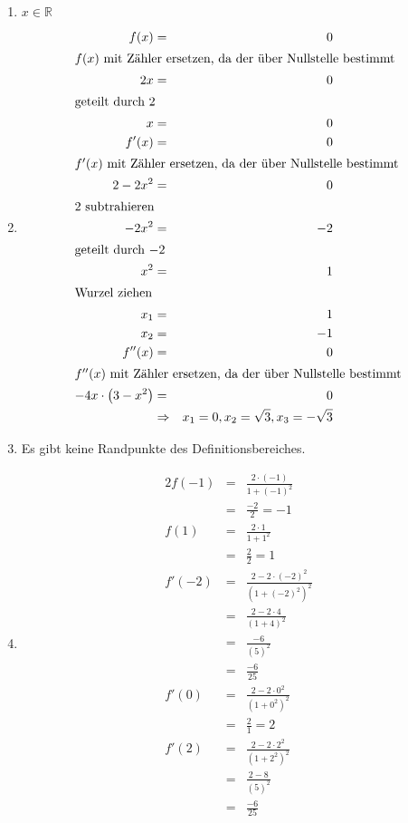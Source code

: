 \documentclass[10pt,a4paper,oneside,ngerman,numbers=noenddot]{scrartcl}
\begin{document}
\begin{enumerate}
	\item $x \in \mathbb{R}$
	\item 
	\begin{alignat*}{2}
	f(x) &=& 0 \\
	\intertext{$f(x)$ mit Zähler ersetzen, da der über Nullstelle bestimmt}
	2x &=& 0 \\
	\intertext{geteilt durch $2$}
	x &=& 0 \\
	f'(x) &=& 0 \\
	\intertext{$f'(x)$ mit Zähler ersetzen, da der über Nullstelle bestimmt}
	2 - 2x^{2} &=& 0 \\
	\intertext{$2$ subtrahieren}
	-2x^{2} &=& -2 \\
	\intertext{geteilt durch $-2$}
	x^{2} &=& 1 \\
	\intertext{Wurzel ziehen}
	x_{1} &=& 1 \\
	x_{2} &=& -1 \\
	f''(x) &=& 0 \\
	\intertext{$f''(x)$ mit Zähler ersetzen, da der über Nullstelle bestimmt}
	-4x \cdot \left(3-x^{2}\right) &=& 0 \\
	&\Rightarrow & x_{1} = 0, x_{2} = \sqrt{3}, x_{3} = - \sqrt{3}
	\end{alignat*}
	\item Es gibt keine Randpunkte des Definitionsbereiches.
	\item 
	\begin{alignat*}{2}
	f(-1) &=& \frac{2\cdot (-1)}{1 + (-1)^{2}} \\
	&=& \frac{-2}{2} = -1 \\
	f(1) &=& \frac{2 \cdot 1}{1 + 1^{2}} \\
	&=& \frac{2}{2} = 1 \\
	f'(-2) &=& \frac{2 - 2 \cdot (-2)^{2}}{\left(1+ (-2)^{2} \right)^{2}} \\
	&=& \frac{2 - 2 \cdot 4}{\left(1+ 4 \right)^{2}} \\
	&=& \frac{-6}{\left(5 \right)^{2}} \\
	&=& \frac{-6}{25} \\
	f'(0) &=& \frac{2 - 2 \cdot 0^{2}}{\left(1+ 0^{2} \right)^{2}} \\
	&=& \frac{2}{1} = 2 \\
	f'(2) &=& \frac{2 - 2 \cdot 2^{2}}{\left(1+ 2^{2} \right)^{2}} \\
	&=& \frac{2 - 8}{\left(5 \right)^{2}} \\
	&=& \frac{-6}{25}
	\end{alignat*}\\

\end{enumerate}
\end{document}
